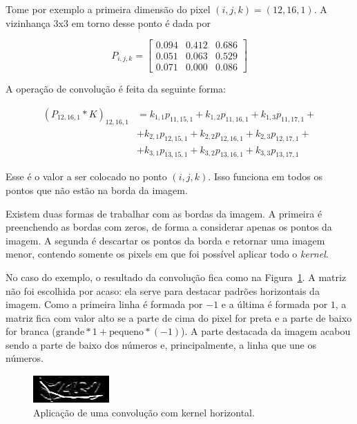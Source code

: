 \documentclass[12pt,twoside,brazilian]{book}
\begin{document}
Tome por exemplo a primeira dimensão do pixel \((i,j,k) = (12,16,1)\). A
vizinhança 3x3 em torno desse ponto é dada por

\[
P_{i,j,k} = \left[\begin{array}{rrr}
0.094 & 0.412 & 0.686 \\ 
0.051 & 0.063 & 0.529 \\ 
0.071 & 0.000 & 0.086 
\end{array}\right]
\]

A operação de convolução é feita da seguinte forma:

\[
\begin{aligned}
(P_{12,16,1} *K )_{12,16,1}
&= k_{1,1}p_{11,15,1} + k_{1,2}p_{11,16,1} + k_{1,3}p_{11,17,1} + \\
&+ k_{2,1}p_{12,15,1} + k_{2,2}p_{12,16,1} + k_{2,3}p_{12,17,1} + \\
&+ k_{3,1}p_{13,15,1} + k_{3,2}p_{13,16,1} + k_{3,3}p_{13,17,1}
\end{aligned}
\]

Esse é o valor a ser colocado no ponto \((i,j,k)\). Isso funciona em
todos os pontos que não estão na borda da imagem.

Existem duas formas de trabalhar com as bordas da imagem. A primeira é
preenchendo as bordas com zeros, de forma a considerar apenas os pontos
da imagem. A segunda é descartar os pontos da borda e retornar uma
imagem menor, contendo somente os pixels em que foi possível aplicar
todo o \emph{kernel}.

No caso do exemplo, o resultado da convolução fica como na
Figura~\ref{fig-tjmg-exemplo-conv-horizontal}. A matriz não foi
escolhida por acaso: ela serve para destacar padrões horizontais da
imagem. Como a primeira linha é formada por \(-1\) e a última é formada
por \(1\), a matriz fica com valor alto se a parte de cima do pixel for
preta e a parte de baixo for branca
(\(\text{grande} * 1 + \text{pequeno} * (-1)\)). A parte destacada da
imagem acabou sendo a parte de baixo dos números e, principalmente, a
linha que une os números.

\begin{figure}

{\centering \includegraphics[width=1.14583in,height=\textheight]{./assets/img/tjmg_conv_horizontal.jpeg}

}

\caption{\label{fig-tjmg-exemplo-conv-horizontal}Aplicação de uma
convolução com kernel horizontal.}

\end{figure}
\end{document}
